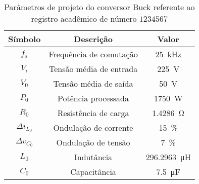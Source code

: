 \begin{table}[!ht]
\centering
\caption{Parâmetros de projeto do conversor Buck referente ao registro acadêmico de número $1234567$}
\label{tab:parametros}
\begin{tabular}{@{}ccc@{}}
\toprule
\textbf{Símbolo} & \textbf{Descrição} & \textbf{Valor}\\ \midrule
$f_s$ & Frequência de comutação & \SI{25}{\kilo\hertz}\\
$V_i$ & Tensão média de entrada  & \SI{225}{\V}\\
$V_0$ & Tensão média de saída  & \SI{50}{\V} \\
$P_0$ & Potência processada  & \SI{1750}{\W} \\
$R_0$ & Resistência de carga & \SI{1.4286}{\ohm} \\
$\Delta{i_{L_0}}$  & Ondulação de corrente & \SI{15}{\%}\\
$\Delta{v_{C_0}}$  & Ondulação de tensão & \SI{7}{\%}\\
$L_0$ & Indutância & \SI{296.2963}{\micro\henry}\\
$C_0$ & Capacitância & \SI{7.5}{\micro\farad}\\
\bottomrule
\end{tabular}
\end{table}

